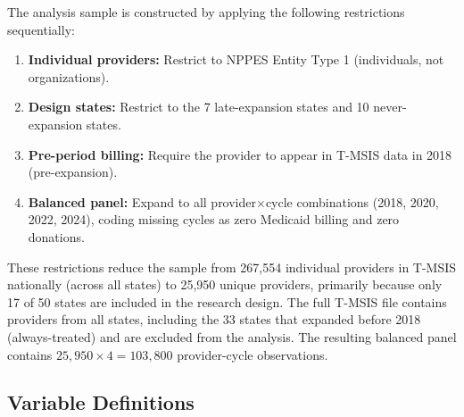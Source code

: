 \documentclass[12pt]{article}
\begin{document}
The analysis sample is constructed by applying the following restrictions sequentially:

\begin{enumerate}
    \item \textbf{Individual providers:} Restrict to NPPES Entity Type 1 (individuals, not organizations).
    \item \textbf{Design states:} Restrict to the 7 late-expansion states and 10 never-expansion states.
    \item \textbf{Pre-period billing:} Require the provider to appear in T-MSIS data in 2018 (pre-expansion).
    \item \textbf{Balanced panel:} Expand to all provider$\times$cycle combinations (2018, 2020, 2022, 2024), coding missing cycles as zero Medicaid billing and zero donations.
\end{enumerate}

\noindent These restrictions reduce the sample from 267,554 individual providers in T-MSIS nationally (across all states) to 25,950 unique providers, primarily because only 17 of 50 states are included in the research design. The full T-MSIS file contains providers from all states, including the 33 states that expanded before 2018 (always-treated) and are excluded from the analysis. The resulting balanced panel contains $25{,}950 \times 4 = 103{,}800$ provider-cycle observations.

\subsection{Variable Definitions}
\end{document}
